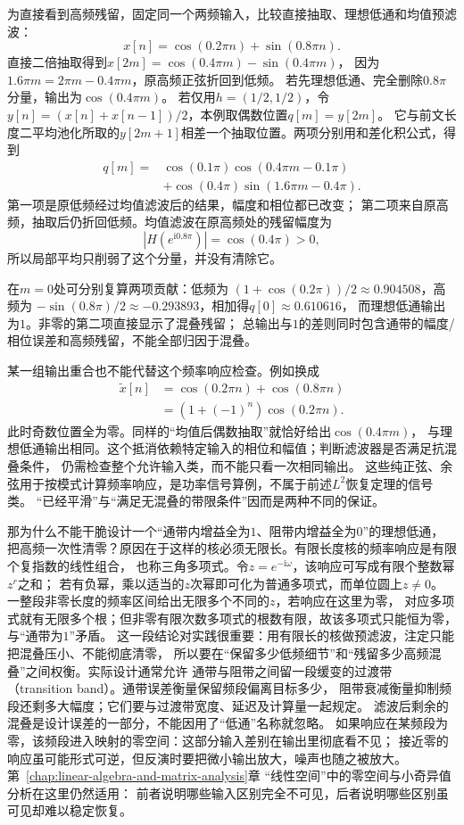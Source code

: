 为直接看到高频残留，固定同一个两频输入，比较直接抽取、理想低通和均值预滤波：
\[
  x[n]=\cos(0.2\pi n)+\sin(0.8\pi n).
\]
直接二倍抽取得到$x[2m]=\cos(0.4\pi m)-\sin(0.4\pi m)$，
因为$1.6\pi m=2\pi m-0.4\pi m$，原高频正弦折回到低频。
若先理想低通、完全删除$0.8\pi$分量，输出为$\cos(0.4\pi m)$。
若仅用$h=(1/2,1/2)$，令$y[n]=(x[n]+x[n-1])/2$，本例取偶数位置$q[m]=y[2m]$。
它与前文长度二平均池化所取的$y[2m+1]$相差一个抽取位置。两项分别用和差化积公式，得到
\[
 \begin{aligned}
  q[m]={}&\cos(0.1\pi)\cos(0.4\pi m-0.1\pi)\\
        &+\cos(0.4\pi)\sin(1.6\pi m-0.4\pi).
 \end{aligned}
\]
第一项是原低频经过均值滤波后的结果，幅度和相位都已改变；
第二项来自原高频，抽取后仍折回低频。均值滤波在原高频处的残留幅度为
\[
  |H(e^{\mathrm i0.8\pi})|=\cos(0.4\pi)>0,
\]
所以局部平均只削弱了这个分量，并没有清除它。

在$m=0$处可分别复算两项贡献：低频为
$(1+\cos(0.2\pi))/2\approx0.904508$，高频为
$-\sin(0.8\pi)/2\approx-0.293893$，相加得$q[0]\approx0.610616$，
而理想低通输出为$1$。非零的第二项直接显示了混叠残留；
总输出与$1$的差则同时包含通带的幅度/相位误差和高频残留，不能全部归因于混叠。

某一组输出重合也不能代替这个频率响应检查。例如换成
\[
 \begin{aligned}
  \widetilde x[n]&=\cos(0.2\pi n)+\cos(0.8\pi n)\\
                 &=(1+(-1)^n)\cos(0.2\pi n).
 \end{aligned}
\]
此时奇数位置全为零。同样的“均值后偶数抽取”就恰好给出$\cos(0.4\pi m)$，
与理想低通输出相同。这个抵消依赖特定输入的相位和幅值；判断滤波器是否满足抗混叠条件，
仍需检查整个允许输入类，而不能只看一次相同输出。
这些纯正弦、余弦用于按模式计算频率响应，是功率信号算例，不属于前述$L^2$恢复定理的信号类。
“已经平滑”与“满足无混叠的带限条件”因而是两种不同的保证。

那为什么不能干脆设计一个“通带内增益全为$1$、阻带内增益全为$0$”的理想低通，
把高频一次性清零？原因在于这样的核必须无限长。有限长度核的频率响应是有限个复指数的线性组合，
也称三角多项式。令$z=e^{-\mathrm i\omega}$，该响应可写成有限个整数幂$z^r$之和；
若有负幂，乘以适当的$z$次幂即可化为普通多项式，而单位圆上$z\neq0$。
一整段非零长度的频率区间给出无限多个不同的$z$，若响应在这里为零，
对应多项式就有无限多个根；但非零有限次数多项式的根数有限，故该多项式只能恒为零，
与“通带为$1$”矛盾。
这一段结论对实践很重要：用有限长的核做预滤波，注定只能把混叠压小、不能彻底清零，
所以要在“保留多少低频细节”和“残留多少高频混叠”之间权衡。实际设计通常允许
通带与阻带之间留一段缓变的过渡带（transition band）。通带误差衡量保留频段偏离目标多少，
阻带衰减衡量抑制频段还剩多大幅度；它们要与过渡带宽度、延迟及计算量一起规定。
滤波后剩余的混叠是设计误差的一部分，不能因用了“低通”名称就忽略。
如果响应在某频段为零，该频段进入映射的零空间：这部分输入差别在输出里彻底看不见；
接近零的响应虽可能形式可逆，但反演时要把微小输出放大，噪声也随之被放大。
第~\ref{chap:linear-algebra-and-matrix-analysis}章
“线性空间”中的零空间与小奇异值分析在这里仍然适用：
前者说明哪些输入区别完全不可见，后者说明哪些区别虽可见却难以稳定恢复。

